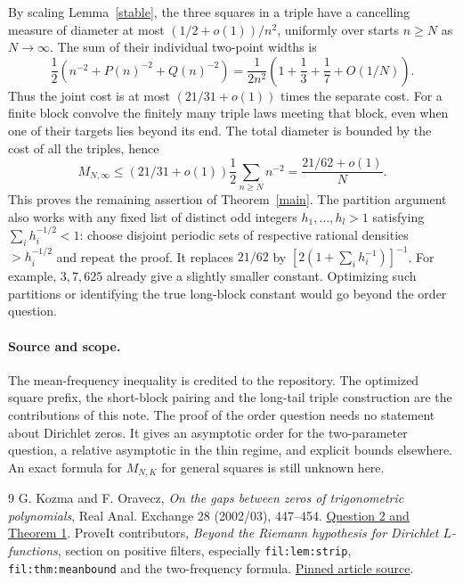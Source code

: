 \documentclass[11pt]{article}
\begin{document}
By scaling Lemma~\ref{stable}, the three squares in a triple have a cancelling measure of diameter at most $(1/2+o(1))/n^2$, uniformly over starts $n\ge N$ as $N\to\infty$. The sum of their individual two-point widths is
\[
 \frac12\left(n^{-2}+P(n)^{-2}+Q(n)^{-2}\right)
      =\frac{1}{2n^2}\left(1+\frac13+\frac17+O(1/N)\right).
\]
Thus the joint cost is at most $(21/31+o(1))$ times the separate cost. For a finite block convolve the finitely many triple laws meeting that block, even when one of their targets lies beyond its end. The total diameter is bounded by the cost of all the triples, hence
\[
 M_{N,\infty}\le(21/31+o(1))\frac12\sum_{n\ge N}n^{-2}
       =\frac{21/62+o(1)}{N}.
\]
This proves the remaining assertion of Theorem~\ref{main}. The partition argument also works with any fixed list of distinct odd integers $h_1,\ldots,h_l>1$ satisfying $\sum_i h_i^{-1/2}<1$: choose disjoint periodic sets of respective rational densities $>h_i^{-1/2}$ and repeat the proof. It replaces $21/62$ by $[2(1+\sum_i h_i^{-1})]^{-1}$. For example, $3,7,625$ already give a slightly smaller constant. Optimizing such partitions or identifying the true long-block constant would go beyond the order question.

\paragraph{Source and scope.}
The mean-frequency inequality is credited to the repository. The optimized square prefix, the short-block pairing and the long-tail triple construction are the contributions of this note. The proof of the order question needs no statement about Dirichlet zeros. It gives an asymptotic order for the two-parameter question, a relative asymptotic in the thin regime, and explicit bounds elsewhere. An exact formula for $M_{N,K}$ for general squares is still unknown here.
\begin{thebibliography}{9}
 G. Kozma and F. Oravecz, \emph{On the gaps between zeros of trigonometric polynomials}, Real Anal. Exchange 28 (2002/03), 447--454. \href{https://arxiv.org/html/math/0601021v1}{Question 2 and Theorem 1}.
 ProveIt contributors, \emph{Beyond the Riemann hypothesis for Dirichlet $L$-functions}, section on positive filters, especially \texttt{fil:lem:strip}, \texttt{fil:thm:meanbound} and the two-frequency formula. \href{https://github.com/VladimirReshetnikov/ProveIt/blob/ff96fd44ab160e65fb8a9d861243828d07c156cf/Analysis/GeneralizedRiemannHypothesis/Article/sections/fil.tex}{Pinned article source}.
\end{thebibliography}
\end{document}
